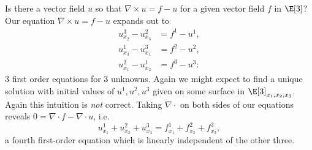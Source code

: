 \begin{example}\label{page:nabla.u.f.u}
Is there a vector field \(u\) so that \(\nabla \times u = f - u\) for a given vector field \(f\) in \(\E[3]\)?
Our equation \(\nabla \times u = f - u\) expands out to
\begin{align*}
u^3_{x_2}-u^2_{x_3} &= f^1 - u^1, \\
u^1_{x_3}-u^3_{x_1} &= f^2 - u^2, \\
u^2_{x_1}-u^1_{x_2} &= f^3 - u^3:
\end{align*}
\(3\) first order equations for \(3\) unknowns.
Again we might expect to find a unique solution with initial values of \(u^1, u^2, u^3\) given on some surface in \(\E[3]_{x_1, x_2, x_3}\).
Again this intuition is \emph{not} correct.
Taking \(\nabla \cdot\) on both sides of our equations reveals \(0=\nabla \cdot f - \nabla \cdot u\), i.e.
\[
u^1_{x_1} + u^2_{x_2} + u^3_{x_3}
=
f^1_{x_1} + f^2_{x_2} + f^3_{x_3},
\]
a fourth first-order equation which is linearly independent of the other three.


\end{example}
